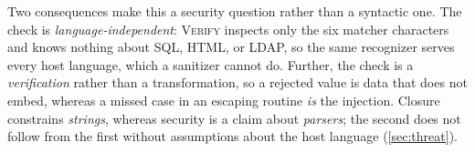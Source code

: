Two consequences make this a security question rather than a syntactic one.
The check is \emph{language-independent}: \textsc{Verify} inspects only the six
matcher characters and knows nothing about SQL, HTML, or LDAP, so the same
recognizer serves every host language, which a sanitizer cannot do.
Further, the check is a \emph{verification} rather than a transformation, so a
rejected value is data that does not embed, whereas a missed case in an escaping
routine \emph{is} the injection.
Closure constrains \emph{strings}, whereas security is a claim about
\emph{parsers}; the second does not follow from the first without
assumptions about the host language (\cref{sec:threat}).

